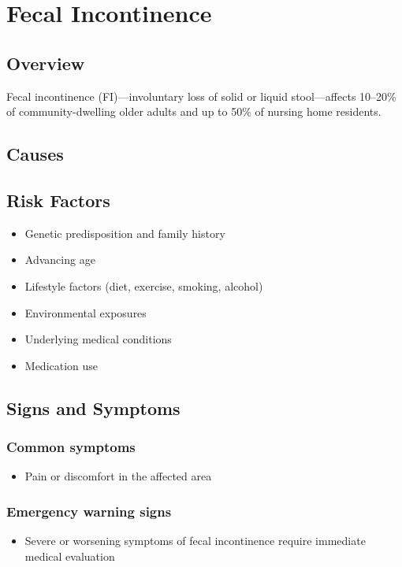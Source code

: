 \chapter{Fecal Incontinence}
\label{sec:Fecal Incontinence}

\section{Overview}
Fecal incontinence (FI)---involuntary loss of solid or liquid stool---affects 10--20\% of community-dwelling older adults and up to 50\% of nursing home residents.
\section{Causes}
\section{Risk Factors}

\begin{itemize}[noitemsep]
  \item Genetic predisposition and family history
  \item Advancing age
  \item Lifestyle factors (diet, exercise, smoking, alcohol)
  \item Environmental exposures
  \item Underlying medical conditions
  \item Medication use
\end{itemize}
\section{Signs and Symptoms}

\subsection{Common symptoms}
\begin{itemize}[noitemsep]
  \item Pain or discomfort in the affected area
  \end{itemize}

\subsection{Emergency warning signs}
\begin{itemize}[noitemsep]
  \item Severe or worsening symptoms of fecal incontinence require immediate medical evaluation
\end{itemize}
